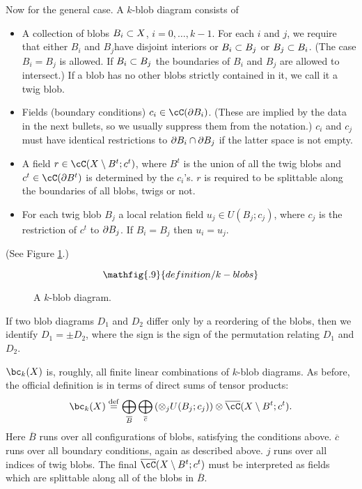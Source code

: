 Now for the general case.
A $k$-blob diagram consists of
\begin{itemize}
\item A collection of blobs $B_i \subset X$, $i = 0, \ldots, k-1$.
For each $i$ and $j$, we require that either $B_i$ and $B_j$have disjoint interiors or
$B_i \subset B_j$ or $B_j \subset B_i$.
(The case $B_i = B_j$ is allowed.
If $B_i \subset B_j$ the boundaries of $B_i$ and $B_j$ are allowed to intersect.)
If a blob has no other blobs strictly contained in it, we call it a twig blob.
\item Fields (boundary conditions) $c_i \in \cC(\bd B_i)$.
(These are implied by the data in the next bullets, so we usually
suppress them from the notation.)
$c_i$ and $c_j$ must have identical restrictions to $\partial B_i \cap \partial B_j$
if the latter space is not empty.
\item A field $r \in \cC(X \setmin B^t; c^t)$,
where $B^t$ is the union of all the twig blobs and $c^t \in \cC(\bd B^t)$
is determined by the $c_i$'s.
$r$ is required to be splittable along the boundaries of all blobs, twigs or not.
\item For each twig blob $B_j$ a local relation field $u_j \in U(B_j; c_j)$,
where $c_j$ is the restriction of $c^t$ to $\partial B_j$.
If $B_i = B_j$ then $u_i = u_j$.
\end{itemize}
(See Figure \ref{blobkdiagram}.)
\begin{figure}[!ht]\begin{equation*}
\mathfig{.9}{definition/k-blobs}
\end{equation*}\caption{A $k$-blob diagram.}\label{blobkdiagram}\end{figure}

If two blob diagrams $D_1$ and $D_2$ 
differ only by a reordering of the blobs, then we identify
$D_1 = \pm D_2$, where the sign is the sign of the permutation relating $D_1$ and $D_2$.

$\bc_k(X)$ is, roughly, all finite linear combinations of $k$-blob diagrams.
As before, the official definition is in terms of direct sums
of tensor products:
\[
	\bc_k(X) \deq \bigoplus_{\overline{B}} \bigoplus_{\overline{c}}
		\left( \otimes_j U(B_j; c_j)\right) \otimes \lf(X \setmin B^t; c^t) .
\]
Here $\overline{B}$ runs over all configurations of blobs, satisfying the conditions above.
$\overline{c}$ runs over all boundary conditions, again as described above.
$j$ runs over all indices of twig blobs. The final $\lf(X \setmin B^t; c^t)$ must be interpreted as fields which are splittable along all of the blobs in $\overline{B}$.

